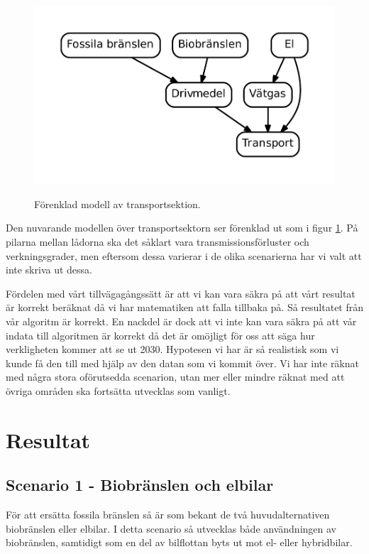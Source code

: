 \documentclass[a4paper,11pt,fleqn, titlepage]{article}
\begin{document}
\begin{figure}[h!]
	\centering
	\includegraphics[scale=0.70]{diagram.pdf}
	\label{modell}
	\caption{Förenklad modell av transportsektion.}
\end{figure}

Den nuvarande modellen över transportsektorn ser förenklad ut som i figur
\ref{modell}. På pilarna mellan lådorna ska det såklart vara
transmissionsförluster och verkningsgrader, men eftersom dessa varierar i
de olika scenarierna har vi valt att inte skriva ut dessa.

Fördelen med vårt tillvägagångssätt är att vi kan vara säkra på att vårt
resultat är korrekt beräknat då vi har matematiken att falla tillbaka på.
Så resultatet från vår algoritm är korrekt. En nackdel är dock att vi inte
kan vara säkra på att vår indata till algoritmen är korrekt då det är
omöjligt för oss att säga hur verkligheten kommer att se ut 2030. Hypotesen
vi har är så realistisk som vi kunde få den till med hjälp av den datan som
vi kommit över. Vi har inte räknat med några stora oförutsedda scenarion,
utan mer eller mindre räknat med att övriga områden ska fortsätta utvecklas
som vanligt.


\section{Resultat}

\subsection{Scenario 1 - Biobränslen och elbilar}

För att ersätta fossila bränslen så är som bekant de två huvudalternativen
biobränslen eller elbilar. I detta scenario så utvecklas både användningen
av biobränslen, samtidigt som en del av bilflottan byts ut mot el- eller
hybridbilar.
\end{document}
